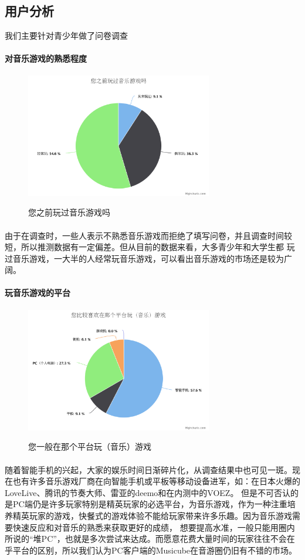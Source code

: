 \documentclass{article}
\begin{document}
\subsection{用户分析}
我们主要针对青少年做了问卷调查
\paragraph{对音乐游戏的熟悉程度}
\begin{figure}[H]
  \centering
  \includegraphics[width=22em]{chart1.png}\\
  \caption{您之前玩过音乐游戏吗}\label{2-1}
\end{figure}
\paragraph{}
由于在调查时，一些人表示不熟悉音乐游戏而拒绝了填写问卷，并且调查时间较短，所以推测数据有一定偏差。但从目前的数据来看，大多青少年和大学生都
玩过音乐游戏，一大半的人经常玩音乐游戏，可以看出音乐游戏的市场还是较为广阔。
\paragraph{玩音乐游戏的平台}
\begin{figure}[H]
  \centering
  \includegraphics[width=22em]{chart2.png}\\
  \caption{您一般在那个平台玩（音乐）游戏}\label{2-2}
\end{figure}
\paragraph{}
随着智能手机的兴起，大家的娱乐时间日渐碎片化，从调查结果中也可见一斑。现在也有许多音乐游戏厂商在向智能手机或平板等移动设备进军，如：在日本火爆的LoveLive、腾讯的节奏大师、雷亚的deemo和在内测中的VOEZ。
但是不可否认的是PC端仍是许多玩家特别是精英玩家的必选平台，为音乐游戏，作为一种注重培养精英玩家的游戏，快餐式的游戏体验不能给玩家带来许多乐趣。因为音乐游戏需要快速反应和对音乐的熟悉来获取更好的成绩，
想要提高水准，一般只能用圈内所说的“堆PC”，也就是多次尝试来达成。而愿意花费大量时间的玩家往往不会在乎平台的区别，所以我们认为PC客户端的Musicube在音游圈仍旧有不错的市场。
\end{document}
